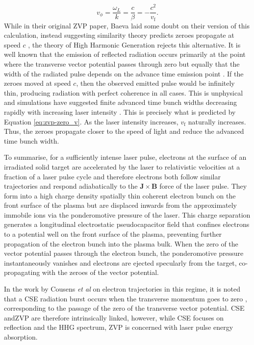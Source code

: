 \begin{equation}\label{eq:zvp-zero_v}
	v_\phi = \frac{\omega_L}{k} = \frac{c}{\beta} = -\frac{c^2}{v_\mathrm{f}}.
\end{equation}
While in their original ZVP paper, Baeva laid some doubt on their version of this calculation, instead suggesting similarity theory predicts zeroes propagate at speed $c$ \cite{baevaZeroVectorPotential2011}, the theory of High Harmonic Generation rejects this alternative. It is well known that the emission of reflected radiation occurs primarily at the point where the transverse vector potential passes through zero \cite{cousensElectronTrajectoriesAssociated2020} but equally that the width of the radiated pulse depends on the advance time emission point \cite{edwardsXRayEmissionEffectiveness2020}. If the zeroes moved at speed $c$, then the observed emitted pulse would be infinitely thin, producing radiation with perfect coherence in all cases. This is unphysical and simulations have suggested finite advanced time bunch widths decreasing rapidly with increasing laser intensity \cite{edwardsXRayEmissionEffectiveness2020}. This is precisely what is predicted by Equation \ref{eq:zvp-zero_v}. As the laser intensity increases, $v_\mathrm{f}$ naturally increases. Thus, the zeroes propagate closer to the speed of light and reduce the advanced time bunch width.

To summarise, for a sufficiently intense laser pulse, electrons at the surface of an irradiated solid target are accelerated by the laser to relativistic velocities at a fraction of a laser pulse cycle and therefore electrons both follow similar trajectories and respond adiabatically to the $\mathbf{J}\times \mathbf{B}$ force of the laser pulse. They form into a high charge density spatially thin coherent electron bunch on the front surface of the plasma but are displaced inwards from the approximately immobile ions via the ponderomotive pressure of the laser. This charge separation generates a longitudinal electrostatic pseudocapacitor field that confines electrons to a potential well on the front surface of the plasma, preventing further propagation of the electron bunch into the plasma bulk. When the zero of the vector potential passes through the electron bunch, the ponderomotive pressure instantaneously vanishes and electrons are ejected specularly from the target, co-propagating with the zeroes of the vector potential.

In the work by Cousens \textit{et al} on electron trajectories in this regime, it is noted that a \ac{CSE} radiation burst occurs when the transverse momentum goes to zero \cite{cousens2020}, corresponding to the passage of the zero of the transverse vector potential. \ac{CSE} and\ac{ZVP} are therefore intrinsically linked, however, while CSE focuses on reflection and the \ac{HHG} spectrum, \ac{ZVP} is concerned with laser pulse energy absorption. 

